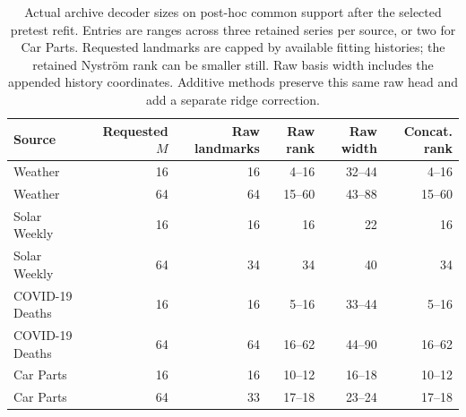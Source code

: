 \begin{table}[!htbp]
\centering\small\setlength{\tabcolsep}{4pt}
\caption{Actual archive decoder sizes on post-hoc common support after the selected pretest refit. Entries are ranges across three retained series per source, or two for Car Parts. Requested landmarks are capped by available fitting histories; the retained Nystr\"om rank can be smaller still. Raw basis width includes the appended history coordinates. Additive methods preserve this same raw head and add a separate ridge correction.}
\label{tab:utility-decoder-sizes}
\begin{tabular}{lrrrrr}
\toprule
Source & Requested $M$ & Raw landmarks & Raw rank & Raw width & Concat. rank \\
\midrule
Weather & 16 & 16 & 4--16 & 32--44 & 4--16 \\
Weather & 64 & 64 & 15--60 & 43--88 & 15--60 \\
Solar Weekly & 16 & 16 & 16 & 22 & 16 \\
Solar Weekly & 64 & 34 & 34 & 40 & 34 \\
COVID-19 Deaths & 16 & 16 & 5--16 & 33--44 & 5--16 \\
COVID-19 Deaths & 64 & 64 & 16--62 & 44--90 & 16--62 \\
Car Parts & 16 & 16 & 10--12 & 16--18 & 10--12 \\
Car Parts & 64 & 33 & 17--18 & 23--24 & 17--18 \\
\bottomrule
\end{tabular}
\end{table}
